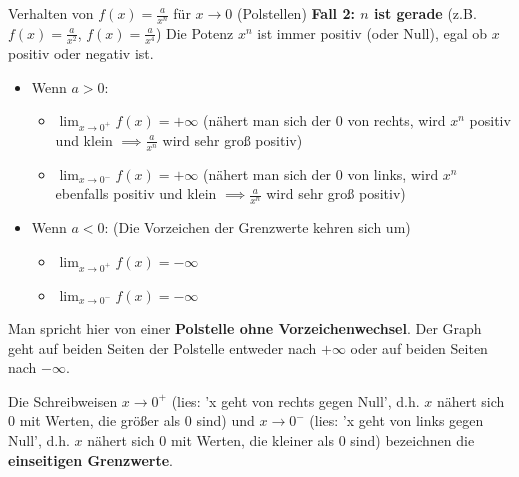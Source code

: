 \begin{merksatzumgebung}{Verhalten von $f(x) = \frac{a}{x^n}$ für $x \to 0$ (Polstellen)}
\textbf{Fall 2: $n$ ist gerade} (z.B. $f(x) = \frac{a}{x^2}$, $f(x) = \frac{a}{x^4}$)
Die Potenz $x^n$ ist immer positiv (oder Null), egal ob $x$ positiv oder negativ ist.
\begin{itemize}
    \item Wenn $a > 0$:
        \begin{itemize}
            \item $\lim_{x \to 0^+} f(x) = +\infty$ (nähert man sich der 0 von rechts, wird $x^n$ positiv und klein $\implies \frac{a}{x^n}$ wird sehr groß positiv)
            \item $\lim_{x \to 0^-} f(x) = +\infty$ (nähert man sich der 0 von links, wird $x^n$ ebenfalls positiv und klein $\implies \frac{a}{x^n}$ wird sehr groß positiv)
        \end{itemize}
    \item Wenn $a < 0$: (Die Vorzeichen der Grenzwerte kehren sich um)
        \begin{itemize}
            \item $\lim_{x \to 0^+} f(x) = -\infty$
            \item $\lim_{x \to 0^-} f(x) = -\infty$
        \end{itemize}
\end{itemize}
Man spricht hier von einer \textbf{Polstelle ohne Vorzeichenwechsel}. Der Graph geht auf beiden Seiten der Polstelle entweder nach $+\infty$ oder auf beiden Seiten nach $-\infty$.

Die Schreibweisen $x \to 0^+$ (lies: 'x geht von rechts gegen Null', d.h. $x$ nähert sich 0 mit Werten, die größer als 0 sind) und $x \to 0^-$ (lies: 'x geht von links gegen Null', d.h. $x$ nähert sich 0 mit Werten, die kleiner als 0 sind) bezeichnen die \textbf{einseitigen Grenzwerte}.
\end{merksatzumgebung}


